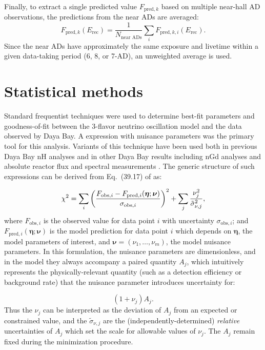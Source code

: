 Finally, to extract a single predicted value $F_{\text{pred},k}$
based on multiple near-hall AD observations,
the predictions from the near ADs are averaged:
\begin{equation}
    F_{\text{pred},k}(E_\text{rec}) = \frac{1}{N_\text{near ADs}}
    \sum_i F_{\text{pred},k,i}(E_\text{rec}).
\end{equation}
Since the near ADs have approximately the same exposure and livetime
within a given data-taking period (6, 8, or 7-AD),
an unweighted average is used.

\section{Statistical methods}
\label{sec:fitter}

Standard frequentist techniques were used to determine best-fit parameters
and goodness-of-fit between the 3-flavor neutrino oscillation model
and the data observed by Daya Bay.
A \chisquare{} expression with nuisance parameters
was the primary tool for this analysis.
Variants of this technique have been used both in previous Daya Bay nH analyses
and in other Daya Bay results including nGd \thetaot{} analyses
and absolute reactor \nuebar{} flux and spectral measurements
\cite{nh2016,ngd2016,reactorflux2017,extractionreactorflux2019}.
The generic structure of such \chisquare{} expressions
can be derived from Eq.~(39.17) of \cite{pdg} as:

\begin{equation}
    \label{eq:chisquare_generic}
    \chi^2 = \sum_i \left(
        \frac{F_{\text{obs},i} - F_{\text{pred},i}(\boldsymbol{\eta};\boldsymbol{\nu})}
            {\sigma_{\text{obs},i}}
        \right)^2
        +
        \sum_j \frac{\nu_j^2}{\tilde{\sigma}_{\nu,j}^2},
\end{equation}
where $F_{\text{obs},i}$ is the observed value for data point $i$
with uncertainty $\sigma_{\text{obs},i}$;
and $F_{\text{pred},i}(\boldsymbol{\eta};\boldsymbol{\nu})$
is the model prediction for data point $i$
which depends on $\boldsymbol{\eta}$, the model parameters of interest,
and $\boldsymbol{\nu}=(\nu_1, \ldots, \nu_m)$,
the model nuisance parameters.
In this formulation, the nuisance parameters are dimensionless,
and in the model they always accompany a paired quantity $A_j$,
which intuitively represents the physically-relevant quantity
(such as a detection efficiency or background rate)
that the nuisance parameter introduces uncertainty for:

\begin{equation}
    (1+\nu_j)A_j.
\end{equation}
Thus the $\nu_j$ can be interpreted as the deviation of $A_j$
from an expected or constrained value,
and the $\tilde{\sigma}_{\nu,j}$ are the (independently-determined)
\emph{relative} uncertainties of $A_j$
which set the scale for allowable values of $\nu_j$.
The $A_j$ remain fixed during the minimization procedure.

